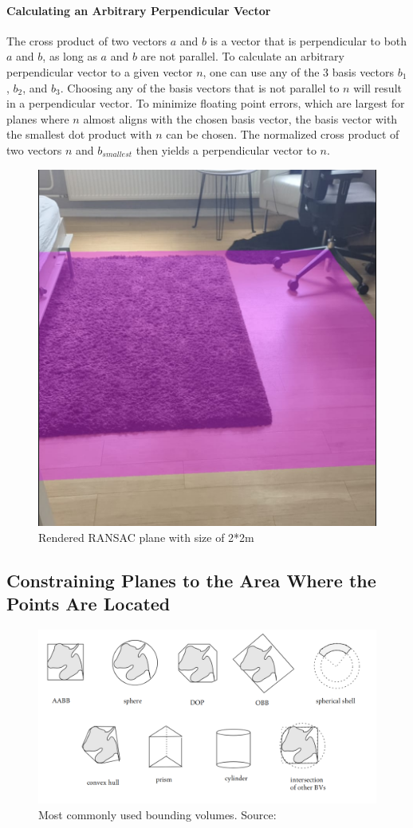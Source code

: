\paragraph{Calculating an Arbitrary Perpendicular Vector}
The cross product of two vectors $a$ and $b$ is a vector that is perpendicular to both $a$ and $b$,
as long as $a$ and $b$ are not parallel.
To calculate an arbitrary perpendicular vector to a given vector $n$, one can use any of the 3 basis vectors ${b_1}$, ${b_2}$, and ${b_3}$.
Choosing any of the basis vectors that is not parallel to $n$ will result in a perpendicular vector.
To minimize floating point errors, which are largest for planes where $n$ almost aligns with the chosen basis vector,
the basis vector with the smallest dot product with $n$ can be chosen.
The normalized cross product of two vectors $n$ and $b_{smallest}$ then yields a perpendicular vector to $n$.

\begin{figure}[ht!]
    \centering
    \includegraphics[width=0.5\linewidth]{images/renderedPlane}
    \caption{Rendered RANSAC plane with size of 2*2m}
\end{figure}

\subsection{Constraining Planes to the Area Where the Points Are Located}\label{subsec:constraining-planes-to-the-area-where-the-points-are-located}

\begin{figure}[ht!]
    \centering
    \includegraphics[width=0.9\linewidth]{images/bounding-volumes}
    \caption{Most commonly used bounding volumes. Source: \cite{gabriel_zachmann_geometric_2002}}
\end{figure}

